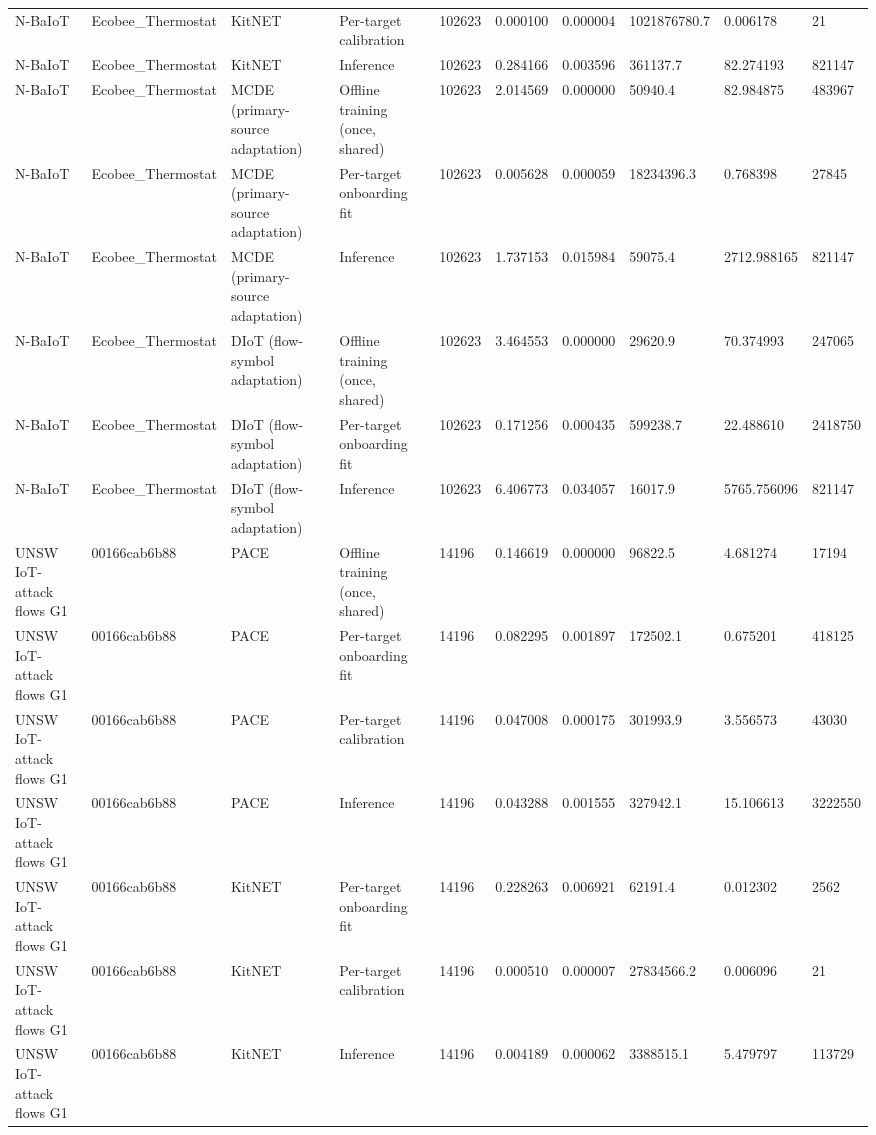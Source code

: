 \begin{tabular}{llllllllll}
N-BaIoT & Ecobee\_Thermostat & KitNET & Per-target calibration & 102623 & 0.000100 & 0.000004 & 1021876780.7 & 0.006178 & 21 \\
N-BaIoT & Ecobee\_Thermostat & KitNET & Inference & 102623 & 0.284166 & 0.003596 & 361137.7 & 82.274193 & 821147 \\
N-BaIoT & Ecobee\_Thermostat & MCDE (primary-source adaptation) & Offline training (once, shared) & 102623 & 2.014569 & 0.000000 & 50940.4 & 82.984875 & 483967 \\
N-BaIoT & Ecobee\_Thermostat & MCDE (primary-source adaptation) & Per-target onboarding fit & 102623 & 0.005628 & 0.000059 & 18234396.3 & 0.768398 & 27845 \\
N-BaIoT & Ecobee\_Thermostat & MCDE (primary-source adaptation) & Inference & 102623 & 1.737153 & 0.015984 & 59075.4 & 2712.988165 & 821147 \\
N-BaIoT & Ecobee\_Thermostat & DIoT (flow-symbol adaptation) & Offline training (once, shared) & 102623 & 3.464553 & 0.000000 & 29620.9 & 70.374993 & 247065 \\
N-BaIoT & Ecobee\_Thermostat & DIoT (flow-symbol adaptation) & Per-target onboarding fit & 102623 & 0.171256 & 0.000435 & 599238.7 & 22.488610 & 2418750 \\
N-BaIoT & Ecobee\_Thermostat & DIoT (flow-symbol adaptation) & Inference & 102623 & 6.406773 & 0.034057 & 16017.9 & 5765.756096 & 821147 \\
UNSW IoT-attack flows G1 & 00166cab6b88 & PACE & Offline training (once, shared) & 14196 & 0.146619 & 0.000000 & 96822.5 & 4.681274 & 17194 \\
UNSW IoT-attack flows G1 & 00166cab6b88 & PACE & Per-target onboarding fit & 14196 & 0.082295 & 0.001897 & 172502.1 & 0.675201 & 418125 \\
UNSW IoT-attack flows G1 & 00166cab6b88 & PACE & Per-target calibration & 14196 & 0.047008 & 0.000175 & 301993.9 & 3.556573 & 43030 \\
UNSW IoT-attack flows G1 & 00166cab6b88 & PACE & Inference & 14196 & 0.043288 & 0.001555 & 327942.1 & 15.106613 & 3222550 \\
UNSW IoT-attack flows G1 & 00166cab6b88 & KitNET & Per-target onboarding fit & 14196 & 0.228263 & 0.006921 & 62191.4 & 0.012302 & 2562 \\
UNSW IoT-attack flows G1 & 00166cab6b88 & KitNET & Per-target calibration & 14196 & 0.000510 & 0.000007 & 27834566.2 & 0.006096 & 21 \\
UNSW IoT-attack flows G1 & 00166cab6b88 & KitNET & Inference & 14196 & 0.004189 & 0.000062 & 3388515.1 & 5.479797 & 113729 \\

\end{tabular}

